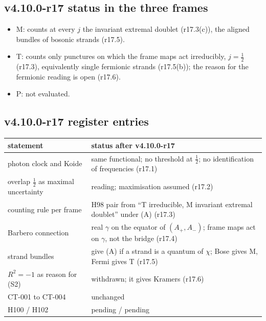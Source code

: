 \subsection*{v4.10.0-r17 status in the three frames}
\label{subsec:v4100-r17-frames}

\begin{itemize}[leftmargin=2em]
\item M: counts at every \(j\) the invariant extremal doublet (r17.3(c)), the aligned bundles of bosonic strands (r17.5).
\item T: counts only punctures on which the frame maps act irreducibly, \(j=\tfrac12\) (r17.3), equivalently single fermionic strands
(r17.5(b)); the reason for the fermionic reading is open (r17.6).
\item P: not evaluated.
\end{itemize}

\subsection*{v4.10.0-r17 register entries}
\label{subsec:v4100-r17-register}

\begin{center}
\small
\begin{tabular}{@{}>{\raggedright\arraybackslash}p{}>{\raggedright\arraybackslash}p{}@{}}
\toprule
statement & status after v4.10.0-r17\\
\midrule
photon clock and Koide & same functional; no threshold at \(\tfrac12\); no identification of frequencies (r17.1)\\
overlap \(\tfrac12\) as maximal uncertainty & reading; maximisation assumed (r17.2)\\
counting rule per frame & H98 pair from ``T irreducible, M invariant extremal doublet'' under (A) (r17.3)\\
Barbero connection & real \(\gamma\) on the equator of \((A_+,A_-)\); frame maps act on \(\gamma\), not the bridge (r17.4)\\
strand bundles & give (A) if a strand is a quantum of \(\chi\); Bose gives M, Fermi gives T (r17.5)\\
\(R^2=-1\) as reason for (S2) & withdrawn; it gives Kramers (r17.6)\\
CT-001 to CT-004 & unchanged\\
H100 / H102 & pending / pending\\
\bottomrule
\end{tabular}
\end{center}

